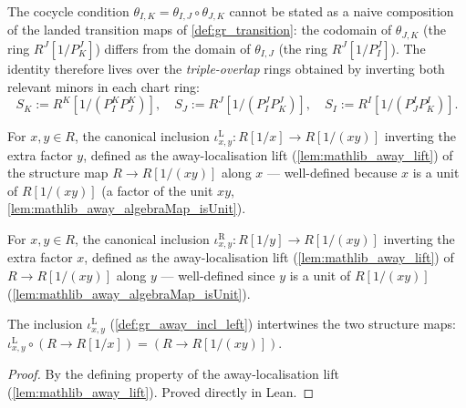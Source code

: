 The cocycle condition \(\theta_{I,K} = \theta_{I,J} \circ \theta_{J,K}\) cannot
be stated as a naive composition of the landed transition maps of
\cref{def:gr_transition}: the codomain of \(\theta_{J,K}\) (the ring
\(R^J[1/P^J_K]\)) differs from the domain of \(\theta_{I,J}\) (the ring
\(R^J[1/P^J_I]\)). The identity therefore lives over the \emph{triple-overlap}
rings obtained by inverting both relevant minors in each chart ring:
\[
  S_K := R^K[1/(P^K_I P^K_J)], \quad
  S_J := R^J[1/(P^J_I P^J_K)], \quad
  S_I := R^I[1/(P^I_J P^I_K)].
\]

\begin{definition}\leanok
  \label{def:gr_away_incl_left}
  For \(x, y \in R\), the canonical inclusion
  \(\iota^{\mathrm{L}}_{x,y} : R[1/x] \to R[1/(xy)]\) inverting the extra factor
  \(y\), defined as the away-localisation lift (\cref{lem:mathlib_away_lift}) of
  the structure map \(R \to R[1/(xy)]\) along \(x\) — well-defined because \(x\)
  is a unit of \(R[1/(xy)]\) (a factor of the unit \(xy\),
  \cref{lem:mathlib_away_algebraMap_isUnit}).
\end{definition}

\begin{definition}\leanok
  \label{def:gr_away_incl_right}
  For \(x, y \in R\), the canonical inclusion
  \(\iota^{\mathrm{R}}_{x,y} : R[1/y] \to R[1/(xy)]\) inverting the extra factor
  \(x\), defined as the away-localisation lift (\cref{lem:mathlib_away_lift}) of
  \(R \to R[1/(xy)]\) along \(y\) — well-defined since \(y\) is a unit of
  \(R[1/(xy)]\) (\cref{lem:mathlib_away_algebraMap_isUnit}).
\end{definition}

\begin{lemma}\leanok
  \label{lem:gr_awayInclLeft_comp_algebraMap}
  The inclusion \(\iota^{\mathrm{L}}_{x,y}\) (\cref{def:gr_away_incl_left})
  intertwines the two structure maps:
  \(\iota^{\mathrm{L}}_{x,y} \circ (R \to R[1/x]) = (R \to R[1/(xy)])\).
\end{lemma}
\begin{proof}

\leanok
  By the defining property of the away-localisation lift
  (\cref{lem:mathlib_away_lift}). Proved directly in Lean.
\end{proof}

